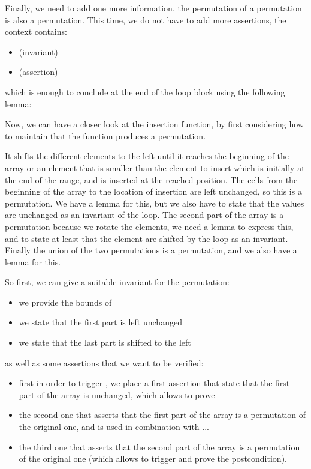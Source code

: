 Finally, we need to add one more information, the permutation of a permutation
is also a permutation. This time, we do not have to add more assertions, the
context contains:
\begin{itemize}
\item {} (invariant)
\item {} (assertion)
\end{itemize}
which is enough to conclude 
at the end of the loop block using the following lemma:






Now, we can have a closer look at the insertion function, by first considering
how to maintain that the function produces a permutation.




It shifts the different elements to the left until it reaches the beginning of
the array or an element that is smaller than the element to insert which is
initially at the end of the range, and is inserted at the reached position. The
cells from the beginning of the array to the location of insertion are left
unchanged, so this is a permutation. We have a lemma for this, but we also have
to state that the values are unchanged as an invariant of the loop. The second
part of the array is a permutation because we rotate the elements, we need a
lemma to express this, and to state at least that the element are shifted by the
loop as an invariant. Finally the union of the two permutations is a
permutation, and we also have a lemma for this.



So first, we can give a suitable invariant for the permutation:

\begin{itemize}
\item we provide the bounds of 
\item we state that the first part is left unchanged
\item we state that the last part is shifted to the left
\end{itemize}

as well as some assertions that we want to be verified:
\begin{itemize}
\item first in order to trigger , we place
  a first assertion that state that the first part of the array is unchanged,
  which allows to prove
\item the second one that asserts that the first part of the array is a
  permutation of the original one, and is used in combination  with ...
\item the third one that asserts that the second part of the array is a
  permutation of the original one (which allows to trigger
   and prove the postcondition).
\end{itemize}


